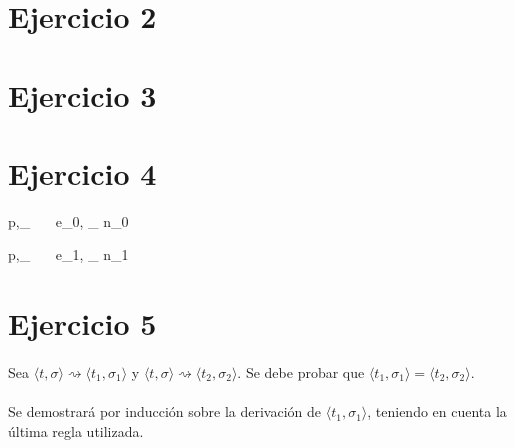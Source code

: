 \documentclass{article}
\begin{document}
\section{Ejercicio 2}


\section{Ejercicio 3}


\section{Ejercicio 4}
{\langle p,\sigma \rangle \Downarrow_{} \ \ \ \langle e_{0}, \sigma \rangle \Downarrow_{} n_{0}}

\vspace{5mm}

{\langle p,\sigma \rangle \Downarrow_{} \ \ \ \langle e_{1}, \sigma \rangle \Downarrow_{} n_{1}}

\vspace{5mm}

\section{Ejercicio 5}
\paragraph{}
Sea $\langle t, \sigma \rangle \rightsquigarrow \langle t_1, \sigma_1 \rangle$ y $\langle t, \sigma \rangle \rightsquigarrow \langle t_2, \sigma_2 \rangle$. Se debe probar que $\langle t_1, \sigma_1 \rangle = \langle t_2, \sigma_2 \rangle$.

\paragraph{}
Se demostrar\'a por inducci\'on sobre la derivaci\'on de $\langle t_1, \sigma_1 \rangle$, teniendo en cuenta la \'ultima regla utilizada. 
\end{document}

